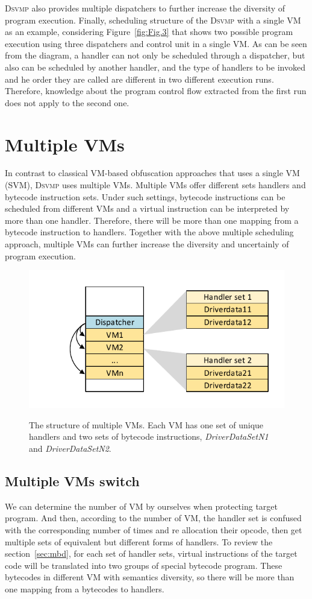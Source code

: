 \documentclass[preprint,12pt,3p]{elsarticle}
\newcommand{\DSVMP}{\textsc{Dsvmp }}
\begin{document}
\DSVMP also provides multiple dispatchers to further increase the diversity of program execution.
Finally, scheduling structure of the \DSVMP with a single VM as an example, considering Figure~\ref{fig:Fig.3} that
shows two possible program execution using three dispatchers and control unit in a single VM. As can be seen
from the diagram, a handler can not only be scheduled through a dispatcher, but also can be scheduled by another handler,
and the type of handlers to be invoked and he order they are called are different in two different execution runs.
Therefore, knowledge about the program control flow extracted from the first run does not apply to the second one.


\section{Multiple VMs}\label{sec:mvm}
In contrast to classical VM-based obfuscation approaches that uses a single VM (SVM), \DSVMP uses multiple VMs.
Multiple VMs offer different sets handlers and bytecode instruction sets. Under such settings,
bytecode instructions can be scheduled from different VMs and a virtual instruction can be interpreted by more than one handler.
Therefore, there will be more than one mapping from a bytecode instruction to handlers.
Together with the above multiple scheduling approach, multiple VMs can further increase the diversity and uncertainly of program execution.

\begin{figure}[!t]
  \centering
  \includegraphics[width=0.6\columnwidth]{figure/figmvm.pdf}\\
  \caption{The structure of multiple VMs. Each VM has one set of unique handlers and two sets of bytecode instructions, \emph{DriverDataSetN1} and \emph{DriverDataSetN2}.}\label{fig:Fig.4}
\end{figure}


\subsection{Multiple VMs switch}
We can determine the number of VM by ourselves when protecting target program.
And then, according to the number of VM, the handler set is confused with the corresponding number of times
and re allocation their opcode, then get multiple sets of equivalent but different forms of handlers.
To review the section~\ref{sec:mbd}, for each set of handler sets,
virtual instructions of the target code will be translated into two groups of special bytecode program.
These bytecodes in different VM with semantics diversity,
so there will be more than one mapping from a bytecodes to handlers.
\end{document}

